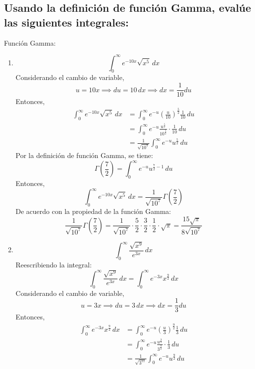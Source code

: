 \begin{multicols}{2}
\section{Usando la definición de función Gamma, evalúe las siguientes integrales:}
Función Gamma:
\begin{center}
\end{center}
\begin{enumerate}
  \item \[
    \displaystyle \int_{0}^{\infty} e^{-10x}\sqrt{x^{5}} \, dx
  \]
  Considerando el cambio de variable,
  \[
    u = 10x \implies du = 10 \, dx \implies dx = \frac{1}{10} du
  \]
  Entonces,
  \[
    \begin{aligned}
      \int_{0}^{\infty} e^{-10x}\sqrt{x^{5}} \, dx &= \int_{0}^{\infty} e^{-u} \left(\frac{u}{10}\right)^{\frac{5}{2}} \frac{1}{10} \, du \\
      &= \int_{0}^{\infty} e^{-u} \frac{u^{\frac{5}{2}}}{10^{\frac{5}{2}}} \cdot \frac{1}{10} \, du \\
      &= \frac{1}{\sqrt{10^{7}}} \int_{0}^{\infty} e^{-u} u^{\frac{5}{2}} \, du
    \end{aligned}
  \]
  Por la definición de función Gamma, se tiene:
  \[
    \Gamma\left(\frac{7}{2}\right) = \int_{0}^{\infty} e^{-u} u^{\frac{7}{2}-1} \,du
  \]
  Entonces,
  \[
    \int_{0}^{\infty} e^{-10x}\sqrt{x^{5}} \, dx = \frac{1}{\sqrt{10^{7}}} \Gamma\left(\frac{7}{2}\right)
  \]
  De acuerdo con la propiedad de la función Gamma:
  \[
    \frac{1}{\sqrt{10^{7}}} \Gamma\left(\frac{7}{2}\right) = \frac{1}{\sqrt{10^{7}}} \cdot \frac{5}{2} \cdot \frac{3}{2} \cdot \frac{1}{2} \cdot \sqrt{\pi} = \frac{15\sqrt{\pi}}{8\sqrt{10^{7}}}
  \]
  \item \[
    \displaystyle \int_{0}^{\infty} \dfrac{\sqrt{x^{9}}}{e^{3x}} \, dx
  \]
  Reescribiendo la integral:
  \[
    \int_{0}^{\infty} \dfrac{\sqrt{x^{9}}}{e^{3x}} \, dx = \int_{0}^{\infty} e^{-3x} x^{\frac{9}{2}} \, dx
  \]
  Considerando el cambio de variable,
  \[
    u = 3x \implies du = 3 \, dx \implies dx = \frac{1}{3} du
  \]
  Entonces,
  \[
    \begin{aligned}
      \int_{0}^{\infty} e^{-3x} x^{\frac{9}{2}} \, dx &= \int_{0}^{\infty} e^{-u} \left(\frac{u}{3}\right)^{\frac{9}{2}} \frac{1}{3} \, du \\
      &= \int_{0}^{\infty} e^{-u} \frac{u^{\frac{9}{2}}}{3^{\frac{9}{2}}} \cdot \frac{1}{3} \, du \\
      &= \frac{1}{\sqrt{3^{11}}} \int_{0}^{\infty} e^{-u} u^{\frac{9}{2}} \, du

\end{aligned}\]
\end{enumerate}
\end{multicols}
